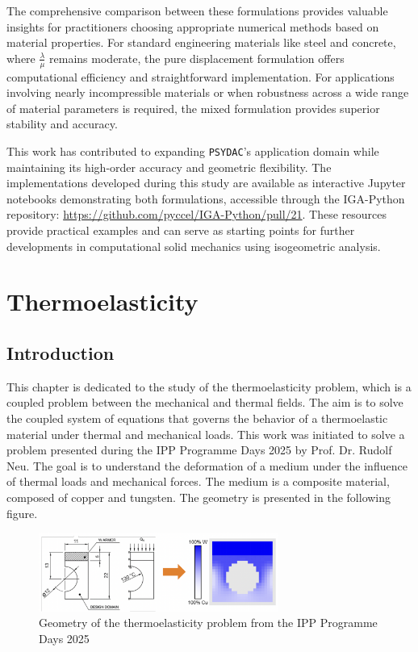 \documentclass[a4paper,12pt,twoside]{report}
\begin{document}
The comprehensive comparison between these formulations provides valuable insights for practitioners choosing appropriate numerical methods based on material properties. For standard engineering materials like steel and concrete, where $\frac{\lambda}{\mu}$ remains moderate, the pure displacement formulation offers computational efficiency and straightforward implementation. For applications involving nearly incompressible materials or when robustness across a wide range of material parameters is required, the mixed formulation provides superior stability and accuracy.

This work has contributed to expanding \texttt{PSYDAC}'s application domain while maintaining its high-order accuracy and geometric flexibility. The implementations developed during this study are available as interactive Jupyter notebooks demonstrating both formulations, accessible through the IGA-Python repository: \href{https://github.com/pyccel/IGA-Python/pull/21}{https://github.com/pyccel/IGA-Python/pull/21}. These resources provide practical examples and can serve as starting points for further developments in computational solid mechanics using isogeometric analysis.


\chapter{Thermoelasticity}
\section{Introduction}
This chapter is dedicated to the study of the thermoelasticity problem, which is a coupled problem between the mechanical and thermal fields. The aim is to solve the coupled system of equations that governs the behavior of a thermoelastic material under thermal and mechanical loads. This work was initiated to solve a problem presented during the IPP Programme Days 2025 by Prof. Dr. Rudolf Neu. The goal is to understand the deformation of a medium under the influence of thermal loads and mechanical forces. The medium is a composite material, composed of copper and tungsten. The geometry is presented in the following figure.
\begin{figure}[!h]
	\centering
	\includegraphics[width=0.7\textwidth]{figures/geometry_thermoelasticity.png}
	\caption{Geometry of the thermoelasticity problem from the IPP Programme Days 2025}
	\label{fig:geometry_thermoelasticity}
\end{figure}
\end{document}
